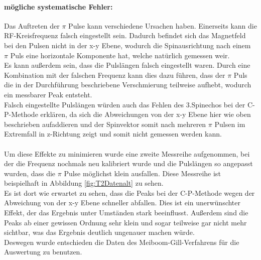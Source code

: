 \documentclass[12pt,a4paper]{article}
\begin{document}
\paragraph{mögliche systematische Fehler:}

Das Auftreten der $\pi$ Pulse kann verschiedene Ursachen haben. Einerseits kann die RF-Kreisfrequenz falsch eingestellt sein. Dadurch befindet sich das Magnetfeld bei den Pulsen nicht in der x-y Ebene, wodurch die Spinausrichtung nach einem $\pi$ Puls eine horizontale Komponente hat, welche natürlich gemessen weir.\\
Es kann außerdem sein, dass die Pulslängen falsch eingestellt waren. Durch eine Kombination mit der falschen Frequenz kann dies dazu führen, dass der $\pi$ Puls die in der Durchführung beschriebene Verschmierung teilweise aufhebt, wodurch ein messbarer Peak entsteht.\\
Falsch eingestellte Pulslängen würden auch das Fehlen des 3.Spinechos  bei der C-P-Methode erklären, da sich die Abweichungen von der x-y Ebene hier wie oben beschrieben aufaddieren und der Spinvektor somit nach mehreren $\pi$ Pulsen im Extremfall in z-Richtung zeigt und somit nicht gemessen werden kann.\\
\\
Um diese Effekte zu minimieren wurde eine zweite Messreihe aufgenommen, bei der die Frequenz nochmals neu kalibriert wurde und die Pulslängen so angepasst wurden, dass die $\pi$ Pulse möglichst klein ausfallen. Diese Messreihe ist beispielhaft in Abbildung \ref{fig:T2Datenalt} zu sehen.\\
Es ist dort wie erwartet zu sehen, dass die Peaks bei der C-P-Methode wegen der Abweichung von der x-y Ebene schneller abfallen. Dies ist ein unerwünschter Effekt, der das Ergebnis unter Umständen stark beeinflusst. Außerdem sind die Peaks ab einer gewissen Ordnung sehr klein und sogar teilweise gar nicht mehr sichtbar, was das Ergebnis deutlich ungenauer machen würde.\\
Deswegen wurde entschieden die Daten des Meiboom-Gill-Verfahrens für die Auswertung zu benutzen.
\end{document}
